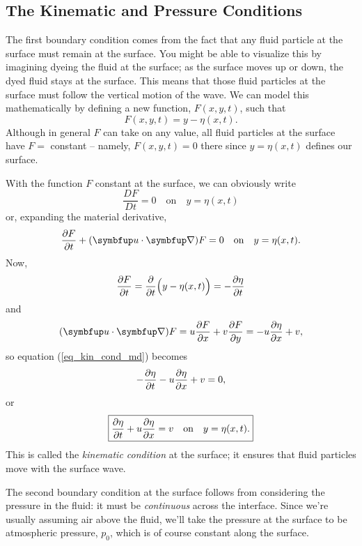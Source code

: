 
\subsection{The Kinematic and Pressure Conditions}
\label{sec_kin_press_cond}

The first boundary condition comes from the fact that any fluid particle at the surface must remain at the surface.  You might be able to visualize this by imagining dyeing the fluid at the surface; as the surface moves up or down, the dyed fluid stays at the surface.  This means that those fluid particles at the surface must follow the vertical motion of the wave.  We can model this mathematically by defining a new function, $F(x, y, t)$, such that
\begin{equation}
F(x, y, t) = y - \eta(x, t).
\end{equation}
Although in general $F$ can take on any value, all fluid particles at the surface have $F =$ constant -- namely, $F(x, y, t) = 0$ there since $y = \eta(x, t)$ defines our surface.

With the function $F$ constant at the surface, we can obviously write
\[
\frac{DF}{Dt} = 0 \quad \text{on} \quad y = \eta(x, t)
\]
or, expanding the material derivative,
\begin{equation}
\label{eq_kin_cond_md}
\dfdx{F}{t} + (\vec{u} \cdot \grad ) F = 0 \quad \text{on} \quad y = \eta(x, t).
\end{equation}
Now,
\[
\frac{\partial {F}}{\partial {t}} = \frac{\partial}{\partial t} \Bigl( y - \eta(x, t) \Bigr) = -\frac{\partial {\eta}}{\partial {t}}
\]
and
\[
(\vec{u} \cdot \grad) F = u \dfdx{F}{x} + v\dfdx{F}{y} = -u \dfdx{\eta}{x} + v,
\]
so equation (\ref{eq_kin_cond_md}) becomes
\[
-\frac{\partial {\eta}}{\partial {t}} - u\frac{\partial {\eta}}{\partial {x}} + v = 0,
\]
or
\begin{equation}
\label{eq_kin_cond}
\boxed{
\frac{\partial {\eta}}{\partial {t}} + u\frac{\partial {\eta}}{\partial {x}} = v \quad \text{on} \quad y = \eta(x, t).
}
\end{equation}
This is called the \emph{kinematic condition} at the surface; it ensures that fluid particles move with the surface wave.

The second boundary condition at the surface follows from considering the pressure in the fluid:  it must be \emph{continuous} across the interface.  Since we're usually assuming air above the fluid, we'll take the pressure at the surface to be atmospheric pressure, $p_0$, which is of course constant along the surface.  

